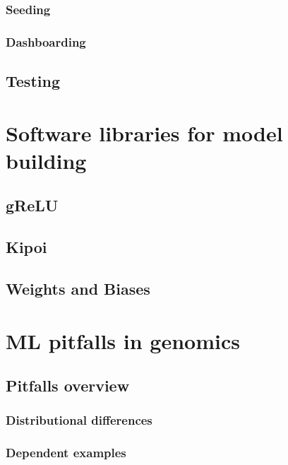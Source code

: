 \documentclass[
]{book}
\begin{document}
\section{Seeding}\label{seeding}

\section{Dashboarding}\label{dashboarding}

\chapter{Testing}\label{testing}

\part{Software libraries for model building}\label{part-software-libraries-for-model-building}

\chapter{gReLU}\label{grelu}

\chapter{Kipoi}\label{kipoi}

\chapter{Weights and Biases}\label{weights-and-biases}

\part{ML pitfalls in genomics}\label{part-ml-pitfalls-in-genomics}

\chapter{Pitfalls overview}\label{pitfalls-overview}

\section{Distributional differences}\label{distributional-differences}

\section{Dependent examples}\label{dependent-examples}
\end{document}
